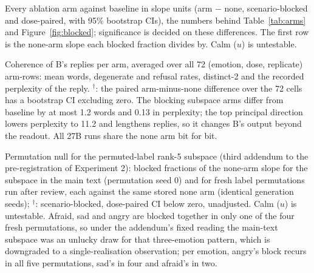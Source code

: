 \documentclass{article}
\newcommand{\ua}{^{\dagger}}   %
\begin{document}
\begin{table}\centering\footnotesize
\caption{Every ablation arm against baseline in slope units (arm $-$ none, scenario-blocked and dose-paired, with 95\% bootstrap CIs), the numbers behind Table~\ref{tab:arms} and Figure~\ref{fig:blocked}; significance is decided on these differences. The first row is the none-arm slope each blocked fraction divides by. Calm ($u$) is untestable.}
\label{tab:slopes}
\resizebox{\textheight}{!}{}
\end{table}

\begin{table}[H]\centering\footnotesize
\caption{Coherence of B's replies per arm, averaged over all 72 (emotion, dose, replicate) arm-rows: mean words, degenerate and refusal rates, distinct-2 and the recorded perplexity of the reply. $\ua$: the paired arm-minus-none difference over the 72 cells has a bootstrap CI excluding zero. The blocking subspace arms differ from baseline by at most 1.2 words and 0.13 in perplexity; the top principal direction lowers perplexity to 11.2 and lengthens replies, so it changes B's output beyond the readout. All 27B runs share the none arm bit for bit.}
\label{tab:coherence}

\end{table}

\begin{table}[H]\centering\footnotesize
\caption{Permutation null for the permuted-label rank-5 subspace (third addendum to the pre-registration of Experiment 2): blocked fractions of the none-arm slope for the subspace in the main text (permutation seed 0) and for fresh label permutations run after review, each against the same stored none arm (identical generation seeds); $\ua$: scenario-blocked, dose-paired CI below zero, unadjusted. Calm ($u$) is untestable. Afraid, sad and angry are blocked together in only one of the four fresh permutations, so under the addendum's fixed reading the main-text subspace was an unlucky draw for that three-emotion pattern, which is downgraded to a single-realisation observation; per emotion, angry's block recurs in all five permutations, sad's in four and afraid's in two.}
\label{tab:permnull}

\end{table}
\end{document}

